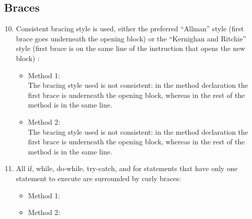 \subsection{Braces}
\begin{enumerate}
	\setcounter{enumi}{9}
	\item Consistent bracing style is used, either the preferred “Allman” style (first brace goes underneath the opening block) or the “Kernighan and Ritchie” style (first brace is on the same line of the instruction that opens the new block) :
	\begin{itemize}
		\item Method 1: \xmark \\
		The bracing style used is not consistent: in the method declaration the first brace is underneath the opening block, whereas in the rest of the method is in the same line.
		\item Method 2: \xmark\\
		The bracing style used is not consistent: in the method declaration the first brace is underneath the opening block, whereas in the rest of the method is in the same line.
	\end{itemize}
	\item All if, while, do-while, try-catch, and for statements that have only one statement to execute are surrounded by curly braces:
	\begin{itemize}
		\item Method 1: \cmark
		\item Method 2: \cmark
	\end{itemize}
\end{enumerate}